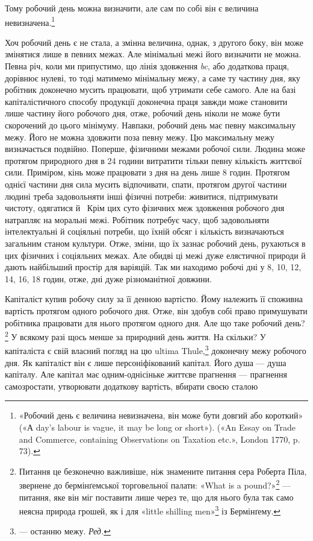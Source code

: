 \parcont{}  %
Тому робочий день можна визначити, але сам по собі він є величина
невизначена.\footnote{
«Робочий день є величина невизначена, він може бути довгий або
короткий» («А day’s labour is vague, it may be long or short»). («An
Essay on Trade and Commerce, containing Observations on Taxation etc.»,
London 1770, p. 73).
}

Хоч робочий день є не стала, а змінна величина, однак, з
другого боку, він може змінятися лише в певних межах. Але мінімальні
межі його визначити не можна. Певна річ, коли ми припустимо,
що лінія здовження \emph{bc}, або додаткова праця, дорівнює
нулеві, то тоді матимемо мінімальну межу, а саме ту частину дня,
яку робітник доконечно мусить працювати, щоб утримати себе
самого. Але на базі капіталістичного способу продукції доконечна
праця завжди може становити лише частину його робочого дня,
отже, робочий день ніколи не може бути скорочений до цього
мінімуму. Навпаки, робочий день має певну максимальну межу.
Його не можна здовжити поза певну межу. Цю максимальну
межу визначається подвійно. Поперше, фізичними межами робочої
сили. Людина може протягом природного дня в 24 години
витратити тільки певну кількість життєвої сили. Приміром, кінь
може працювати з дня на день лише 8 годин. Протягом однієї
частини дня сила мусить відпочивати, спати, протягом другої
частини людині треба задовольняти інші фізичні потреби: живитися,
підтримувати чистоту, одягатися й~ Крім цих суто
фізичних меж здовження робочого дня натрапляє на моральні
межі. Робітник потребує часу, щоб задовольняти інтелектуальні
й соціяльні потреби, що їхній обсяг і кількість визначаються
загальним станом культури. Отже, зміни, що їх зазнає робочий
день, рухаються в цих фізичних і соціяльних межах. Але обидві
ці межі дуже елястичної природи й дають найбільший простір
для варіяцій. Так ми находимо робочі дні у 8, 10, 12, 14, 16, 18
годин, отже, дні дуже різноманітної довжини.

Капіталіст купив робочу силу за її денною вартістю. Йому
належить її споживна вартість протягом одного робочого дня.
Отже, він здобув собі право примушувати робітника працювати
для нього протягом одного дня. Але що таке робочий день?\footnote{
Питання це безконечно важливіше, ніж знамените питання сера
Роберта Піла, звернене до бермінґемської торговельної палати: «What
is a pound?»\footnote*{
Що таке фунт стерлінґів? \emph{Ред.}
} — питання, яке він міг поставити лише через те, що для
нього була так само неясна природа грошей, як і для «little shilling men»\footnote*{
— людців від шилінґів. \emph{Ред.}
}
із Бермінґему.
}
У всякому разі щось менше за природний день життя. На
скільки? У капіталіста є свій власний погляд на цю ultima Thule,\footnote*{
— останню межу. \emph{Ред.}
}
доконечну межу робочого дня. Як капіталіст він є лише персоніфікований
капітал. Його душа — душа капіталу. Але капітал
має одним-однісіньке життєве прагнення — прагнення самозростати,
утворювати додаткову вартість, вбирати своєю сталою
\parbreak{}  %
